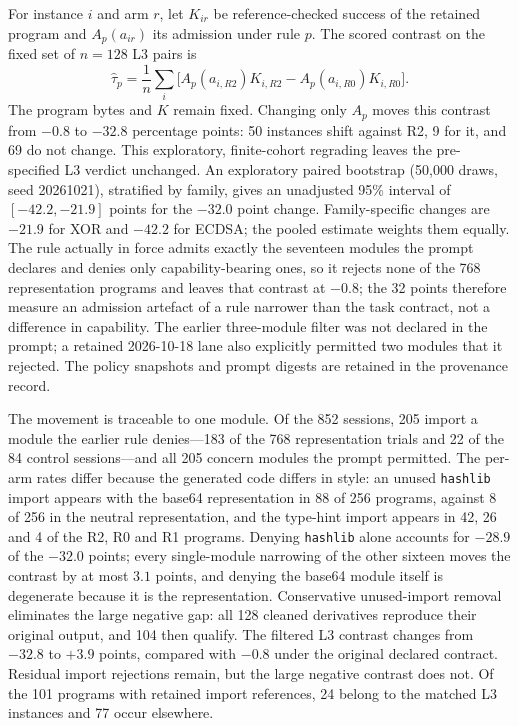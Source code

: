 For instance $i$ and arm $r$, let $K_{ir}$ be reference-checked success of
the retained program and $A_p(a_{ir})$ its admission under rule $p$.
The scored contrast on the fixed set of $n=128$ L3 pairs is
\[
\widehat\tau_p=\frac{1}{n}\sum_i
\bigl[A_p(a_{i,R2})K_{i,R2}-A_p(a_{i,R0})K_{i,R0}\bigr].
\]
The program bytes and $K$ remain fixed. Changing only $A_p$ moves this
contrast from $-0.8$ to $-32.8$ percentage points: 50 instances shift against
R2, 9 for it, and 69 do not change. This exploratory, finite-cohort regrading
leaves the pre-specified L3 verdict unchanged. An exploratory paired bootstrap
(50{,}000 draws, seed 20261021), stratified by family, gives an unadjusted
95\% interval of $[-42.2,-21.9]$ points for the
$-32.0$ point change. Family-specific changes are $-21.9$ for XOR and $-42.2$
for ECDSA; the pooled estimate weights them equally. The rule actually in force
admits exactly the seventeen modules the prompt declares and denies only
capability-bearing ones, so it rejects none of the 768 representation
programs and leaves that contrast at $-0.8$; the 32 points therefore measure
an admission artefact of a rule narrower than the task contract, not a
difference in capability. The earlier three-module filter was not declared in the prompt; a retained
2026-10-18 lane also explicitly permitted two modules that it rejected.
The policy snapshots and prompt digests are retained in the provenance record.

The movement is traceable to one module. Of the 852 sessions, 205 import a
module the earlier rule denies---183 of the 768 representation trials and 22
of the 84 control sessions---and all 205 concern modules the prompt
permitted. The per-arm rates differ because the generated code differs in
style: an unused \texttt{hashlib} import appears with the base64 representation in 88
of 256 programs, against 8 of 256 in the neutral representation, and the
type-hint import appears in 42, 26 and 4 of the R2, R0 and R1 programs.
Denying \texttt{hashlib} alone accounts for $-28.9$ of the $-32.0$ points;
every single-module narrowing of the other sixteen moves the contrast by at
most $3.1$ points, and denying the base64 module itself is degenerate
because it is the representation. Conservative unused-import removal
eliminates the large negative gap: all 128 cleaned derivatives reproduce
their original output, and 104 then qualify. The filtered L3 contrast changes
from $-32.8$ to $+3.9$ points, compared with $-0.8$ under the original declared
contract. Residual import rejections remain, but the large negative contrast
does not. Of the 101 programs with retained import references, 24 belong to
the matched L3 instances and 77 occur elsewhere.

